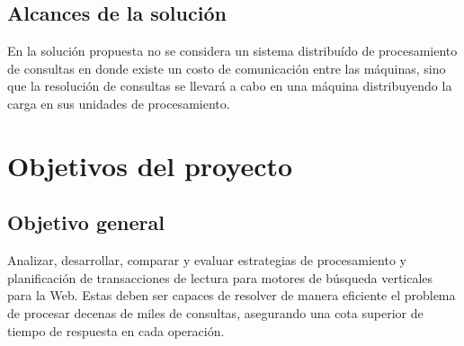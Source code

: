 \subsection{Alcances de la solución}
\label{intro:alcancesdelasolucion}
En la solución propuesta no se considera un sistema distribuído de procesamiento de consultas en donde existe un costo de comunicación entre las máquinas, sino que la resolución de consultas se llevará a cabo en una máquina distribuyendo la carga en sus unidades de procesamiento.

% 


\section{Objetivos del proyecto}
\label{intro:objetivosysolucion}



\subsection{Objetivo general}
\label{intro:objetivogeneral}
Analizar, desarrollar, comparar y evaluar estrategias de procesamiento y planificación de transacciones de lectura para motores de búsqueda verticales para la Web. Estas deben ser capaces de resolver de manera eficiente el problema de procesar decenas de miles de consultas, asegurando una cota superior de tiempo de respuesta en cada operación.


